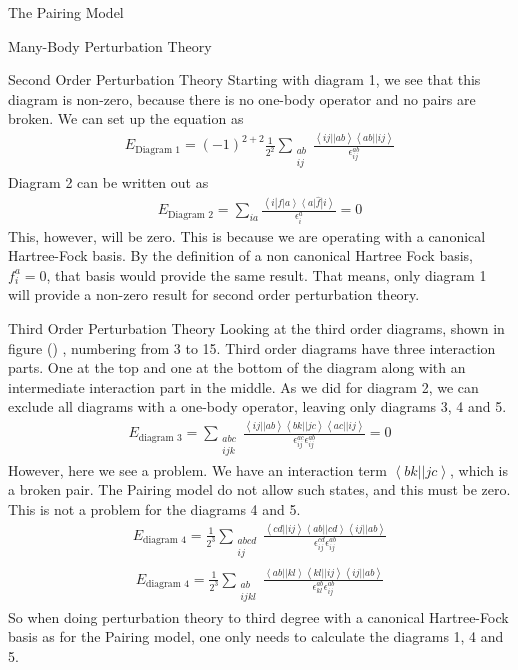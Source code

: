 \documentclass[twoside,english]{uiofysmaster}
\begin{document}
\begin{chapter}{The Pairing Model}
\begin{section}{Many-Body Perturbation Theory}
		\begin{subsection}{Second Order Perturbation Theory}
			Starting with diagram 1, we see that this diagram is non-zero, because there is no one-body operator and no pairs are broken. We can set up the equation as
			\begin{align}
				E_\text{Diagram 1} = (-1)^{2+2} \frac{1}{2^2} \sum_{\substack{ab \\ ij}} \frac{\left< ij || ab \right> \left< ab || ij \right>}{\epsilon_{ij}^{ab}}
			\end{align}
			Diagram 2 can be written out as
			\begin{align}
				E_\text{Diagram 2} = \sum_{ia} \frac{\left<i\right|f\left|a\right> \left<a\right| \hat f \left| i \right>}{\epsilon_i^a} = 0
			\end{align}
			This, however, will be zero. This is because we are operating with a canonical Hartree-Fock basis. By the definition of a non canonical Hartree Fock basis, $f_i^a = 0$, that basis would provide the same result. That means, only diagram 1 will provide a non-zero result for second order perturbation theory. 

		\end{subsection}

		\begin{subsection}{Third Order Perturbation Theory}
			Looking at the third order diagrams, shown in figure () , numbering from 3 to 15. Third order diagrams have three interaction parts. One at the top and one at the bottom of the diagram along with an intermediate interaction part in the middle. As we did for diagram 2, we can exclude all diagrams with a one-body operator, leaving only diagrams 3, 4 and 5. 
			\begin{align}
				E_{\text{diagram 3}} = \sum_{\substack{abc \\ ijk}} \frac{\left<ij||ab\right>\left<bk||jc\right>\left<ac||ij\right>}{\epsilon_{ij}^{ac} \epsilon_{ij}^{ab}} = 0
			\end{align}
			However, here we see a problem. We have an interaction term $\left<bk||jc\right>$, which is a broken pair. The Pairing model do not allow such states, and this must be zero. This is not a problem for the diagrams 4 and 5. 
			\begin{align}
				E_{\text{diagram 4}} = \frac{1}{2^3} \sum_{\substack{abcd \\ ij}} \frac{\left<cd||ij\right>\left<ab||cd\right>\left<ij||ab\right>}{\epsilon_{ij}^{cd} \epsilon_{ij}^{ab}}
			\end{align}
			\begin{align}
				E_{\text{diagram 4}} = \frac{1}{2^3} \sum_{\substack{ab \\ ijkl}} \frac{\left<ab||kl\right>\left<kl||ij\right>\left<ij||ab\right>}{\epsilon_{kl}^{ab} \epsilon_{ij}^{ab}}
			\end{align}
			So when doing perturbation theory to third degree with a canonical Hartree-Fock basis as for the Pairing model, one only needs to calculate the diagrams 1, 4 and 5. 


\end{subsection}
\end{section}
\end{chapter}
\end{document}
